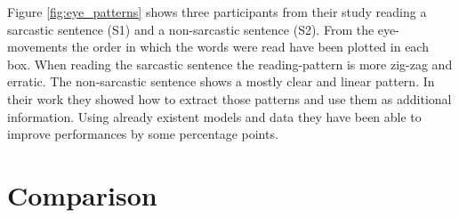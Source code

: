 \documentclass[sigconf,  review=false, nonacm=true]{acmart}
\begin{document}
Figure \ref{fig:eye_patterns} shows three participants from their study reading a sarcastic sentence (S1) and a non-sarcastic sentence (S2). From the eye-movements the order in which the words were read have been plotted in each box. When reading the sarcastic sentence the reading-pattern is more zig-zag and erratic. The non-sarcastic sentence shows a mostly clear and linear pattern. In their work they showed how to extract those patterns and use them as additional information. Using already existent models and data they have been able to improve performances by some percentage points. 


\section{Comparison}

\end{document}
